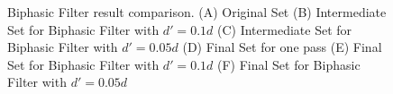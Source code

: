 \begin{figure}[H]
\begin{subfigure}[b]{1\linewidth}
\begin{subfigure}[b]{0.29\linewidth}
  	\caption{} 
  	\label{fig:bp5_2_sweden} 
  	\vspace{4ex}
  \end{subfigure}
\end{subfigure}
  \caption[Two-phase Filter result comparison]{Biphasic Filter result comparison. (A) Original Set (B) Intermediate Set for Biphasic Filter with $d'=0.1d$ (C) Intermediate Set for Biphasic Filter with $d'=0.05d$ (D) Final Set for one pass (E) Final Set for Biphasic Filter with $d'=0.1d$ (F) Final Set for Biphasic Filter with $d'=0.05d$ }
  \label{fig:bp_sweden} 
\end{figure}

